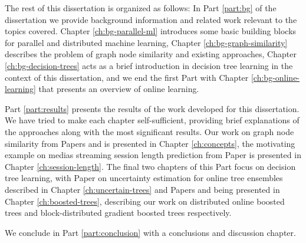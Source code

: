 The rest of this dissertation is organized as follows:
In Part \ref{part:bg} of the dissertation we provide background information and
related work relevant to the topics covered. Chapter
\ref{ch:bg-parallel-ml} introduces some basic building blocks
for parallel and distributed machine learning, Chapter \ref{ch:bg-graph-similarity} describes the problem
of graph node similarity and existing approaches, Chapter \ref{ch:bg-decision-trees} acts as a brief introduction
in decision tree learning in the context of this dissertation, and we end the first Part with Chapter \ref{ch:bg-online-learning} that presents an overview of online learning.

Part \ref{part:results} presents the results of the work developed for this
dissertation. We have tried to make each chapter self-sufficient, providing
brief explanations of the approaches along with the most significant results.
Our work on graph node similarity from Papers \conceptsicdmNum and \conceptskaisNum
is presented in Chapter \ref{ch:concepts},
the motivating example on medias streaming session length prediction from Paper \sessionlengthNum is presented in Chapter \ref{ch:session-length}. The final
two chapters of this Part focus on decision tree learning, with Paper \uncertaintreesNum
on uncertainty estimation for online tree ensembles described in Chapter \ref{ch:uncertain-trees} and Papers \boostvhtNum and \blockgbtNum
being presented in Chapter \ref{ch:boosted-trees}, describing our work on distributed online boosted trees
and block-distributed gradient boosted trees respectively.

We conclude in Part \ref{part:conclusion} with a conclusions and discussion
chapter.

